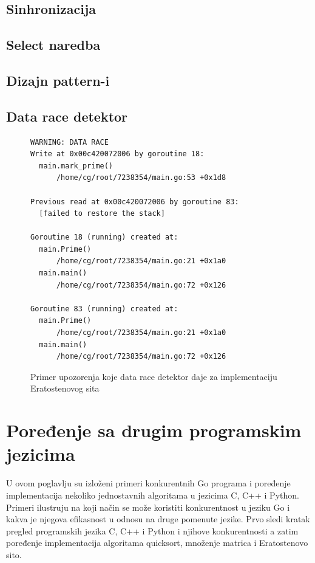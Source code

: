 \documentclass[12pt,oneside]{memoir}
\begin{document}
\section{Sinhronizacija}

\section{Select naredba}

\section{Dizajn pattern-i}

\section{Data race detektor}

\begin{figure}
\begin{center}

\begin{Verbatim}[fontsize=\small]
WARNING: DATA RACE
Write at 0x00c420072006 by goroutine 18:
  main.mark_prime()
      /home/cg/root/7238354/main.go:53 +0x1d8

Previous read at 0x00c420072006 by goroutine 83:
  [failed to restore the stack]

Goroutine 18 (running) created at:
  main.Prime()
      /home/cg/root/7238354/main.go:21 +0x1a0
  main.main()
      /home/cg/root/7238354/main.go:72 +0x126

Goroutine 83 (running) created at:
  main.Prime()
      /home/cg/root/7238354/main.go:21 +0x1a0
  main.main()
      /home/cg/root/7238354/main.go:72 +0x126
\end{Verbatim}

\caption{Primer upozorenja koje data race detektor daje za implementaciju Eratostenovog sita}
\label{fig:datarace}
\end{center}
\end{figure}



\chapter {Poređenje sa drugim programskim jezicima}
U ovom poglavlju su izloženi primeri konkurentnih Go programa i poređenje implementacija nekoliko jednostavnih algoritama u jezicima C, C++ i Python. Primeri ilustruju na koji način se može koristiti konkurentnost u jeziku Go i kakva je njegova efikasnost u odnosu na druge pomenute jezike. Prvo sledi kratak pregled programskih jezika C, C++ i Python i njihove konkurentnosti a zatim poređenje implementacija algoritama quicksort, množenje matrica i Eratostenovo sito.
\end{document}

